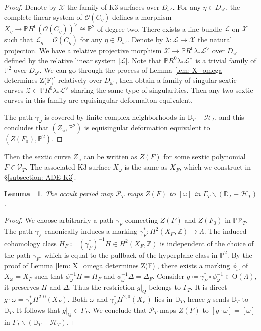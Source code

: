 \documentclass[12pt,reqno,a4paper]{amsart}
\newtheorem{lem}[thm]{Lemma~}
\theoremstyle{remark}
\theoremstyle{definition}
\newcommand{\ZZ}{\mathbb{Z}}
\newcommand{\PP}{\mathbb{P}}
\newcommand{\DD}{\mathbb{D}}
\newcommand{\Prd}{\mathscr{P}}
\newcommand{\calH}{\mathcal{H}}
\newcommand{\calV}{\mathcal{V}}
\newcommand{\calO}{\mathcal{O}}
\newcommand{\calL}{\mathcal{L}}
\newcommand{\calX}{\mathcal{X}}
\newcommand{\calZ}{\mathcal{Z}}
\newcommand\Or{\mathrm{O}}
\newcommand{\bs}{\backslash}
\begin{document}
\begin{proof}
    Denote by $\calX$ the family of K3 surfaces over $D_{\omega'}$. 
    For any $\eta\in D_{\omega'}$, the complete linear system of $\calO(C_\eta)$ defines a morphism $X_\eta\to \PP H^0(\calO(C_\eta))^\vee\cong\PP^2$ of degree two.
    There exists a line bundle $\calL$ on $\calX$ such that $\calL_\eta=\calO(C_\eta)$ for any $\eta\in D_{\omega'}$.
    Denote by $\lambda\colon \calL\to\calX$ the natural projection.
    We have a relative projective morphism $\calX\to \PP R^0\lambda_*\calL^\vee$ over $D_{\omega'}$ defined by the relative linear system $|\calL|$.
    Note that $\PP R^0\lambda_*\calL^\vee$ is a trivial family of $\PP^2$ over $D_{\omega'}$.
    We can go through the process of Lemma \ref{lem: X_omega determines Z(F)} relatively over $D_{\omega'}$, then obtain a family of singular sextic curves $\calZ\subset \PP R^0\lambda_*\calL^\vee$ sharing the same type of singularities.
    Then any two sextic curves in this family are equisingular deformaiton equivalent.

    The path $\gamma_\omega$ is covered by finite complex neighborhoods in $\DD_T-\calH_T$, and this concludes that $(Z_\omega,\PP^2)$ is equisingular deformation equivalent to $(Z(F_0),\PP^2)$.
\end{proof}
Then the sextic curve $Z_\omega$ can be written as $Z(F)$ for some sextic polynomial $F\in\calV_T$.
The associated K3 surface $X_\omega$ is the same as $X_F$, which we construct in \S \ref{subsection: ADE K3}.

\begin{lem}
\label{lem: Prd_T coincides with global period map}
    The occult period map $\Prd_T$ maps $Z(F)$ to $[\omega]$ in $\Gamma_T\bs (\DD_T-\calH_T)$.
\end{lem}
\begin{proof}
    We choose arbitrarily a path $\gamma_F$ connecting $Z(F)$ and $Z(F_0)$ in $\PP\calV_T$. 
    The path $\gamma_F$ canonically induces a marking $\gamma_F^*\colon H^2(X_F,\ZZ)\to\Lambda$.
    The induced cohomology class $H_F\coloneqq (\gamma_F^*)^{-1} H\in H^2(X_F,\ZZ)$ is independent of the choice of the path $\gamma_F$, which is equal to the pullback of the hyperplane class in $\PP^2$.
    By the proof of Lemma \ref{lem: X_omega determines Z(F)}, there exists a marking $\phi_\omega$ of $X_\omega=X_F$ such that $\phi_\omega^{-1} H = H_F$ and $\phi_\omega^{-1} \Delta = \Delta_F$.
    Consider $g\coloneqq \gamma_F^*\circ \phi_\omega^{-1}\in \Or(\Lambda)$, it preserves $H$ and $\Delta$. Thus the restriction $g|_Q$ belongs to $\widetilde{\Gamma}_T$.
    It is direct $g\cdot\omega = \gamma_F^* H^{2,0}(X_F)$. 
    Both $\omega$ and $\gamma_F^* H^{2,0}(X_F)$ lies in $\DD_T$, hence $g$ sends $\DD_T$ to $\DD_T$. It follows that $g|_Q\in \Gamma_T$. We conclude that $\Prd_T$ maps $Z(F)$ to $[g\cdot\omega]=[\omega]$ in $\Gamma_T\bs (\DD_T-\calH_T)$.
\end{proof}
\end{document}
